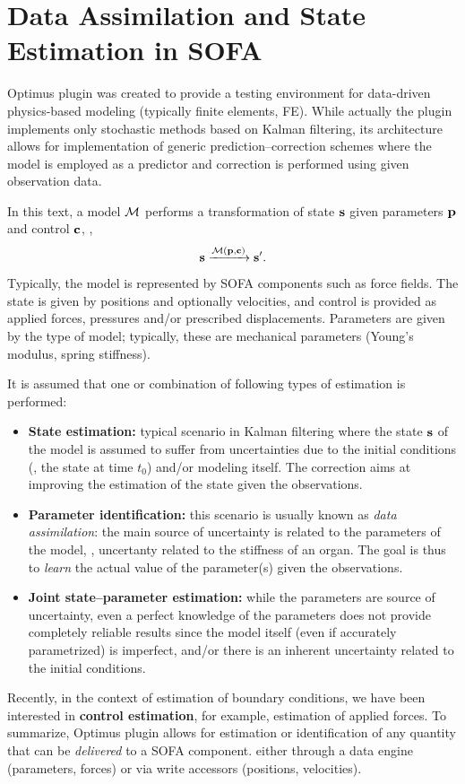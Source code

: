 \documentclass[10pt]{article}
\begin{document}
\section{Data Assimilation and State Estimation in SOFA}
\label{s:overview}
Optimus plugin was created to provide a testing environment for data-driven physics-based modeling (typically finite elements, FE).
While actually the plugin implements only stochastic methods based on Kalman filtering, its architecture allows for implementation of 
generic prediction--correction schemes where the model is employed as a predictor and correction is performed using given observation data. 

In this text, a model $\mathcal{M}$ performs a transformation of state $\mathbf{s}$ given parameters $\mathbf{p}$ and control $\mathbf{c}$, \ie, 
\begin{equation}
\mathbf{s} \xrightarrow{\mathcal{M}(\mathbf{p}, \mathbf{c})} \mathbf{s}'.
\end{equation}
Typically, the model is represented by SOFA components such as force fields. The state is given by positions and optionally velocities, and
control is provided as applied forces, pressures and/or prescribed displacements. Parameters are given by the type of model; typically, these are
mechanical parameters (Young's modulus, spring stiffness). 

It is assumed that one or combination of following types of estimation is performed:
\begin{itemize}
	\item {\bf State estimation:} typical scenario in Kalman filtering where the state $\mathbf{s}$ of the model is assumed to suffer from uncertainties due to 
	the initial conditions (\ie, the state at time $t_0$) and/or modeling itself. The correction aims at improving the estimation of the state given the observations.
	\item {\bf Parameter identification:} this scenario is usually known as \emph{data assimilation}: the main source of uncertainty is related to the 
	parameters of the model, \ie, uncertanty related to the stiffness of an organ. The goal is thus to \emph{learn} the actual value of the parameter(s)
	given the observations. 
	\item {\bf Joint state--parameter estimation:} while the parameters are source of uncertainty, even a perfect  knowledge of the parameters does not 
	provide completely reliable results since the model itself (even if accurately parametrized) is imperfect, and/or there is an inherent uncertainty 
	related to the initial conditions. 	
\end{itemize}
Recently, in the context of estimation of boundary conditions, we have been interested in {\bf control estimation}, for example, estimation of applied forces. 
To summarize, Optimus plugin allows for estimation or identification of any quantity that can be \emph{delivered} to a SOFA component. either through a data engine (parameters, forces) or via write accessors (positions, velocities).
\end{document}
